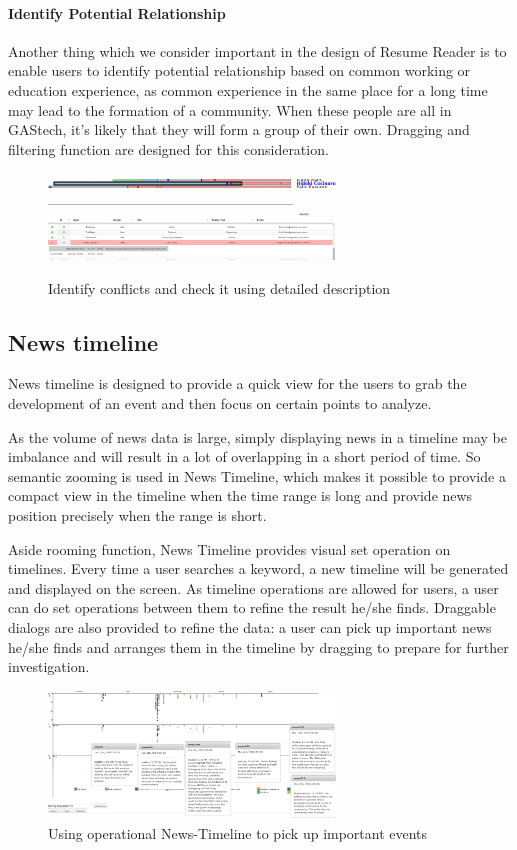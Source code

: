 \documentclass{vgtc}                          %
\begin{document}
\paragraph{Identify Potential Relationship}
Another thing which we consider important in the design of Resume Reader is to enable users to identify potential relationship based on common working or education experience, as common experience in the same place for a long time may lead to the formation of a community. When these people are all in GAStech, it's likely that they will form a group of their own. Dragging and filtering function are designed for this consideration.

\begin{figure}[htb!]
  \centering
  \includegraphics[width=3in]{SingleExperienceLine1.png}
  -----------------------------------------------------
  \includegraphics[width=3in]{SingleExperienceLine2.png}
  \caption{Identify conflicts and check it using detailed description}
\end{figure}

\subsection{News timeline}
News timeline is designed to provide a quick view for the users to grab the development of an event and then focus on certain points to analyze. 
\par
As the volume of news data is large, simply displaying news in a timeline may be imbalance and will result in a lot of overlapping in a short period of time. So semantic zooming is used in News Timeline, which makes it possible to provide a compact view in the timeline when the time range is long and provide news position precisely when the range is short.
\par
Aside rooming function, News Timeline provides visual set operation on timelines. Every time a user searches a keyword, a new timeline will be generated and displayed on the screen. As timeline operations are allowed for users, a user can do set operations between them to refine the result he/she finds. Draggable dialogs are also provided to refine the data: a user can pick up important news he/she finds and arranges them in the timeline by dragging to prepare for further investigation.
\begin{figure}[htb!]
  \centering
  \includegraphics[width=3in]{image017.png}
  \caption{Using operational News-Timeline to pick up important events}
\end{figure}
\end{document}
